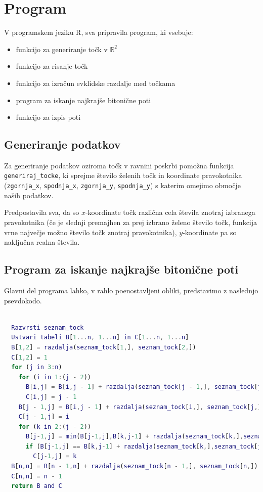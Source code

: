 \documentclass[12pt,a4paper]{amsart}
\theoremstyle{definition}
\theoremstyle{plain}
\newcommand{\R}{\mathbb R}
\begin{document}
\section{Program}

\noindent
V programskem jeziku R, sva pripravila program, ki vsebuje:

\begin{itemize}
  \item funkcijo za generiranje točk v $\R^2$
  \item funkcijo za risanje točk
  \item funkcijo za izračun evklidske razdalje med točkama
  \item program za iskanje najkrajše bitonične poti
  \item funkcijo za izpis poti
  \newline

\end{itemize}

\subsection{Generiranje podatkov}

\noindent
Za generiranje podatkov oziroma točk v ravnini poskrbi pomožna funkcija \texttt{generiraj\_tocke}, ki sprejme
število želenih točk in koordinate pravokotnika (\texttt{zgornja\_x}, \texttt{spodnja\_x}, \texttt{zgornja\_y},
\texttt{spodnja\_y}) s katerim omejimo območje naših podatkov. 
\newline

\noindent
Predpostavila sva, da so $x$-koordinate točk
različna cela števila znotraj izbranega pravokotnika (če je slednji premajhen za prej izbrano želeno število
točk, funkcija vrne največje možno število točk znotraj pravokotnika), $y$-koordinate pa so naključna
realna števila.
\newline

\subsection{Program za iskanje najkrajše bitonične poti}

\noindent
Glavni del programa lahko, v rahlo poenostavljeni obliki, predstavimo z naslednjo
psevdokodo.
\newline

\begin{lstlisting}[basicstyle=\tiny, language=Matlab]

  Razvrsti seznam_tock
  Ustvari tabeli B[1...n, 1...n] in C[1...n, 1...n]
  B[1,2] = razdalja(seznam_tock[1,], seznam_tock[2,])
  C[1,2] = 1
  for (j in 3:n)
    for (i in 1:(j - 2))
      B[i,j] = B[i,j - 1] + razdalja(seznam_tock[j - 1,], seznam_tock[j,])
      C[i,j] = j - 1
    B[j - 1,j] = B[i,j - 1] + razdalja(seznam_tock[i,], seznam_tock[j,])
    C[j - 1,j] = i
    for (k in 2:(j - 2))
      B[j-1,j] = min(B[j-1,j],B[k,j-1] + razdalja(seznam_tock[k,],seznam_tock[j,]))
      if (B[j-1,j] == B[k,j-1] + razdalja(seznam_tock[k,],seznam_tock[j,]))
        C[j-1,j] = k
  B[n,n] = B[n - 1,n] + razdalja(seznam_tock[n - 1,], seznam_tock[n,])
  C[n,n] = n - 1
  return B and C

\end{lstlisting}
\end{document}
